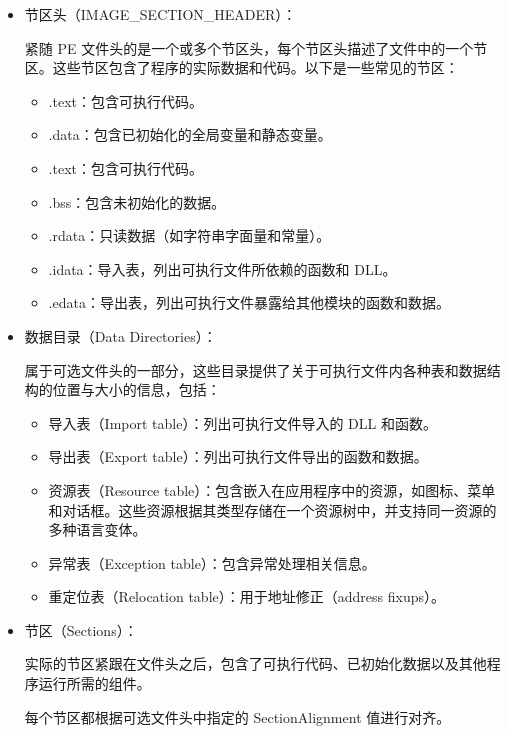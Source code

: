 \begin{itemize}
\begin{itemize}
\end{itemize}

\item 
节区头（IMAGE\_SECTION\_HEADER）：

紧随 PE 文件头的是一个或多个节区头，每个节区头描述了文件中的一个节区。这些节区包含了程序的实际数据和代码。以下是一些常见的节区：

\begin{itemize}
\item 
.text：包含可执行代码。

\item 
.data：包含已初始化的全局变量和静态变量。

\item 
.text：包含可执行代码。

\item 
.bss：包含未初始化的数据。

\item 
.rdata：只读数据（如字符串字面量和常量）。

\item 
.idata：导入表，列出可执行文件所依赖的函数和 DLL。

\item 
.edata：导出表，列出可执行文件暴露给其他模块的函数和数据。
\end{itemize}

\item 
数据目录（Data Directories）：

属于可选文件头的一部分，这些目录提供了关于可执行文件内各种表和数据结构的位置与大小的信息，包括：

\begin{itemize}
\item 
导入表（Import table）：列出可执行文件导入的 DLL 和函数。

\item 
导出表（Export table）：列出可执行文件导出的函数和数据。

\item 
资源表（Resource table）：包含嵌入在应用程序中的资源，如图标、菜单和对话框。这些资源根据其类型存储在一个资源树中，并支持同一资源的多种语言变体。

\item 
异常表（Exception table）：包含异常处理相关信息。

\item 
重定位表（Relocation table）：用于地址修正（address fixups）。
\end{itemize}

\item 
节区（Sections）：

实际的节区紧跟在文件头之后，包含了可执行代码、已初始化数据以及其他程序运行所需的组件。

每个节区都根据可选文件头中指定的 SectionAlignment 值进行对齐。
\end{itemize}


